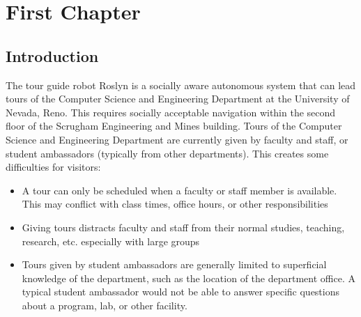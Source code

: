 \documentclass[11pt]{report}
\begin{document}
\begin{preface}

\pagebreak



\begin{singlespace}

 \tableofcontents   %

 \listoftables

 \listoffigures     %

 

\end{singlespace}



\pagebreak


\end{preface}


\chapter{First Chapter}
\section{Introduction}
The tour guide robot Roslyn is a socially aware autonomous system that can lead tours of the Computer Science and Engineering Department at the University of Nevada, Reno. This requires socially acceptable navigation within the second floor of the Scrugham Engineering and Mines building.
Tours of the Computer Science and Engineering Department are currently given by faculty and staff, or student ambassadors (typically from other departments). This creates some difficulties for visitors:
\begin{itemize}
 \item A tour can only be scheduled when a faculty or staff member is available. This may conflict with class times, office hours, or other responsibilities
 \item Giving tours distracts faculty and staff from their normal studies, teaching, research, etc. especially with large groups
 \item Tours given by student ambassadors are generally limited to superficial knowledge of the department, such as the location of the department office. A typical student ambassador would not be able to answer specific questions about a program, lab, or other facility. 
\end{itemize}
\end{document}
